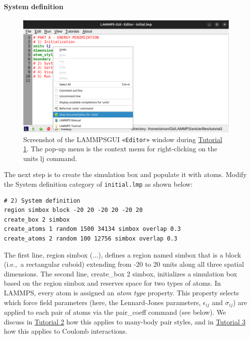 \documentclass[9pt,tutorial]{livecoms}
\newcommand{\lmpcmd}[1]{\colorbox{listing}{\textcolor{command}{\small{#1}}}} %
\newcommand{\flecmd}[1]{\textcolor{command}{\texttt{#1}}} %
\newcommand{\guicmd}[1]{\textcolor{command}{\texttt{«#1»}}} %
\newcommand{\lammpsgui}{\textsf{LAMMPS\textendash GUI}}
\begin{document}
\paragraph{System definition}

\begin{figure}
\centering
\includegraphics[width=\linewidth]{GUI-1.png}
\caption{Screenshot of the \lammpsgui{} \guicmd{Editor} window during
  \hyperref[lennard-jones-label]{Tutorial 1}.  The pop-up menu is the
  context menu for right-clicking on the \lmpcmd{units lj} command.}
\label{fig:GUI-1}
\end{figure}

The next step is to create the simulation box and populate it with
atoms.  Modify the \lmpcmd{System definition} category of
\flecmd{initial.lmp} as shown below:
\begin{lstlisting}
# 2) System definition
region simbox block -20 20 -20 20 -20 20
create_box 2 simbox
create_atoms 1 random 1500 34134 simbox overlap 0.3
create_atoms 2 random 100 12756 simbox overlap 0.3
\end{lstlisting}
The first line, \lmpcmd{region simbox (...)}, defines a region named
\lmpcmd{simbox} that is a block (i.e.,~a rectangular cuboid) extending
from -20 to 20 units along all three spatial dimensions.  The second
line, \lmpcmd{create\_box 2 simbox}, initializes a simulation box based
on the region \lmpcmd{simbox} and reserves space for two types of atoms.
In LAMMPS, every atom is assigned an \emph{atom type}
property.  This property selects which force field parameters (here,
the Lennard-Jones parameters, $\epsilon_{ij}$ and $\sigma_{ij}$) are
applied to each pair of atoms via the \lmpcmd{pair\_coeff} command (see below).
We discuss in \hyperref[carbon-nanotube-label]{Tutorial 2} how this
applies to many-body pair styles, and in
\hyperref[all-atom-label]{Tutorial 3} how this applies to Coulomb
interactions.
\end{document}
